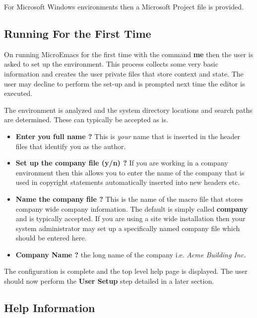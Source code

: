 \documentclass[11pt,a4paper,pdftex]{article}
\begin{document}
  For Microsoft Windows environments then a Microsoft Project file is
  provided.

\subsection{Running For the First Time}

  On running MicroEmacs for the first time with the command \textbf{me} then
  the user is asked to set up the environment. This process collects some very
  basic information and creates the user private files that store context and
  state. The user may decline to perform the set-up and is prompted next time
  the editor is executed.

  The environment is analyzed and the system directory locations and search
  paths are determined. These can typically be accepted as is.

  \begin{itemize}

    \item \textbf{Enter you full name ?} This is \textit{your} name that is
    inserted in the header files that identify you as the author.

    \item \textbf{Set up the company file (y/n) ?} If you are working in a
    company environment then this allows you to enter the name of the company
    that is used in copyright statements automatically inserted into new
    headers etc.

    \item \textbf{Name the company file ?} This is the name of the macro file
    that stores company wide company information. The default is simply called
    \textbf{company} and is typically accepted. If you are using a site wide
    installation then your system administrator may set up a specifically
    named company file which should be entered here.

    \item \textbf{Company Name ?} the long name of the company i.e.
    \textit{Acme Building Inc.}

  \end{itemize}

  The configuration is complete and the top level help page is displayed. The
  user should now perform the \textbf{User Setup} step detailed in a later
  section.

\subsection{Help Information}
\end{document}
